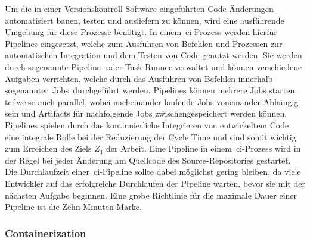 Um die in einer Versionskontroll-Software eingeführten Code-Änderungen automatisiert bauen, testen und ausliefern zu
können, wird eine ausführende Umgebung für diese Prozesse benötigt.
In einem\ \acrshort{ci}-Prozess werden hierfür Pipelines eingesetzt, welche zum Ausführen von Befehlen und Prozessen
zur automatischen Integration und dem Testen von Code genutzt werden.
Sie werden durch sogenannte Pipeline- oder Task-Runner verwaltet und können verschiedene Aufgaben verrichten,
welche durch das Ausführen von Befehlen innerhalb sogenannter\ \glqq Jobs\grqq\ durchgeführt werden.
Pipelines können mehrere Jobs starten, teilweise auch parallel, wobei nacheinander laufende Jobs voneinander
Abhängig sein und Artifacts für nachfolgende Jobs zwischengespeichert werden können.
Pipelines spielen durch das kontinuierliche Integrieren von entwickeltem Code eine integrale Rolle bei der Reduzierung
der Cycle Time und sind somit wichtig zum Erreichen des Ziels $Z_1$ der Arbeit.
Eine Pipeline in einem\ \acrshort{ci}-Prozess wird in der Regel bei jeder Änderung am Quellcode des Source-Repositories
gestartet.
Die Durchlaufzeit einer\ \acrshort{ci}-Pipeline sollte dabei möglichst gering bleiben, da viele Entwickler
auf das erfolgreiche Durchlaufen der Pipeline warten, bevor sie mit der nächsten Aufgabe beginnen.
Eine grobe Richtlinie für die maximale Dauer einer Pipeline ist die Zehn-Minuten-Marke.

\subsubsection{Containerization}

